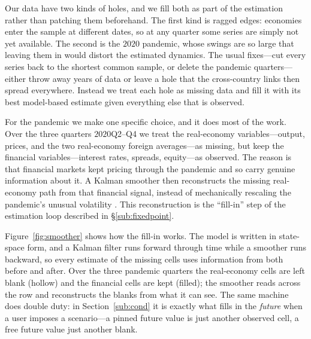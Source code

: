 \documentclass[11pt]{article}
\begin{document}
Our data have two kinds of holes, and we fill both as part of the estimation rather than patching them
beforehand. The first kind is ragged edges: economies enter the sample at different dates, so at any
quarter some series are simply not yet available. The second is the $2020$ pandemic, whose swings are so
large that leaving them in would distort the estimated dynamics. The usual fixes---cut every series back
to the shortest common sample, or delete the pandemic quarters---either throw away years of data or leave
a hole that the cross-country links then spread everywhere. Instead we treat each hole as missing data and
fill it with its best model-based estimate given everything else that is observed.

For the pandemic we make one specific choice, and it does most of the work. Over the three quarters
$2020$Q2--Q4 we treat the real-economy variables---output, prices, and the two real-economy foreign
averages---as missing, but keep the financial variables---interest rates, spreads, equity---as observed.
The reason is that financial markets kept pricing through the pandemic and so carry genuine information
about it. A Kalman smoother \citep{DurbinKoopman2012} then reconstructs the missing real-economy path from
that financial signal, instead of mechanically rescaling the pandemic's unusual volatility
\citep{LenzaPrimiceri2022,CarrieroClarkMarcellino2015}. This reconstruction is the ``fill-in'' step of the
estimation loop described in \S\ref{sub:fixedpoint}.

Figure~\ref{fig:smoother} shows how the fill-in works. The model is written in state-space form, and a
Kalman filter runs forward through time while a smoother runs backward, so every estimate of the missing
cells uses information from both before and after. Over the three pandemic quarters the real-economy cells
are left blank (hollow) and the financial cells are kept (filled); the smoother reads across the row and
reconstructs the blanks from what it can see. The same machine does double duty: in Section~\ref{sub:cond}
it is exactly what fills in the \emph{future} when a user imposes a scenario---a pinned future value is
just another observed cell, a free future value just another blank.
\end{document}
